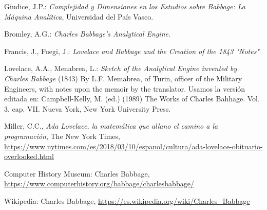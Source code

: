 \documentclass[runningheads,a4paper]{llncs}
\begin{document}
\begin{thebibliography}{4}

 Giudice, J.P.: \textit{Complejidad y Dimensiones en los
Estudios sobre Babbage: La Máquina Analítica}, Universidad del País Vasco.

 Bromley, A.G.:\textit{ Charles Babbage’s
Analytical Engine}. 

 Francis, J., Fuegi, J.: \textit{Lovelace and Babbage and the Creation
of the 1843 "Notes"}

 Lovelace, A.A., Menabrea, L.: \textit{Sketch of the Analytical Engine invented
by Charles Babbage} (1843) By L.F. Memabrea, of Turin, officer of the Military
Engineers, with notes upon the memoir by the translator. Usamos la versión
editada en: Campbell-Kelly, M. (ed.) (1989) The Works of Charles
Bahhage. Vol. 3, cap. VII. Nueva York, New York University Press.

 Miller, C.C., \textit{Ada Lovelace, la matemática que allano el camino a la programación}, The New York Times, \url{https://www.nytimes.com/es/2018/03/10/espanol/cultura/ada-lovelace-obituario-overlooked.html}

 Computer History Museum: Charles Babbage, \url{https://www.computerhistory.org/babbage/charlesbabbage/}

 Wikipedia: Charles Babbage, \url{https://es.wikipedia.org/wiki/Charles_Babbage}

\end{thebibliography}
\end{document}
